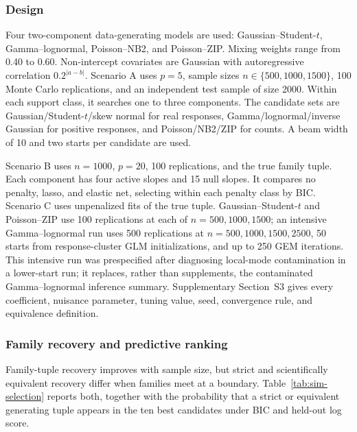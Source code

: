 \documentclass[a4paper,fleqn]{cas-sc}
\begin{document}
\subsubsection{Design}

Four two-component data-generating models are used: Gaussian--Student-$t$, Gamma--lognormal, Poisson--NB2, and Poisson--ZIP. Mixing weights range from 0.40 to 0.60. Non-intercept covariates are Gaussian with autoregressive correlation $0.2^{|a-b|}$. Scenario A uses $p=5$, sample sizes $n\in\{500,1000,1500\}$, 100 Monte Carlo replications, and an independent test sample of size 2000. Within each support class, it searches one to three components. The candidate sets are Gaussian/Student-$t$/skew normal for real responses, Gamma/lognormal/inverse Gaussian for positive responses, and Poisson/NB2/ZIP for counts. A beam width of 10 and two starts per candidate are used.

Scenario B uses $n=1000$, $p=20$, 100 replications, and the true family tuple. Each component has four active slopes and 15 null slopes. It compares no penalty, lasso, and elastic net, selecting within each penalty class by BIC. Scenario C uses unpenalized fits of the true tuple. Gaussian--Student-$t$ and Poisson--ZIP use 100 replications at each of $n=500,1000,1500$; an intensive Gamma--lognormal run uses 500 replications at $n=500,1000,1500,2500$, 50 starts from response-cluster GLM initializations, and up to 250 GEM iterations. This intensive run was prespecified after diagnosing local-mode contamination in a lower-start run; it replaces, rather than supplements, the contaminated Gamma--lognormal inference summary. Supplementary Section~S3 gives every coefficient, nuisance parameter, tuning value, seed, convergence rule, and equivalence definition.

\subsubsection{Family recovery and predictive ranking}

Family-tuple recovery improves with sample size, but strict and scientifically equivalent recovery differ when families meet at a boundary. Table~\ref{tab:sim-selection} reports both, together with the probability that a strict or equivalent generating tuple appears in the ten best candidates under BIC and held-out log score.
\end{document}
